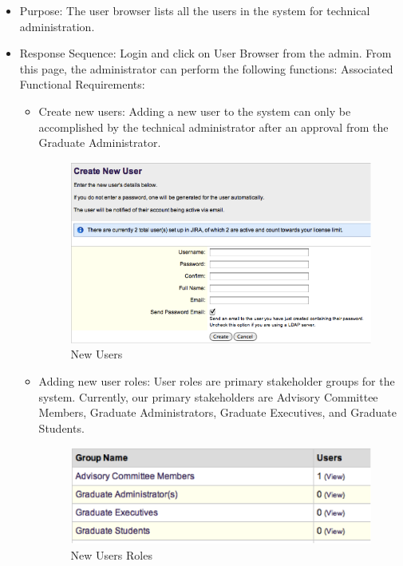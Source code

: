 \documentclass[11pt,a4paper]{report}
\begin{document}
\begin{itemize}
\item Purpose: The user browser lists all the users in the system for technical administration. 
\item Response Sequence: Login and click on User Browser from the admin. From this page, the administrator can perform the following functions:
Associated Functional Requirements:
\begin{itemize}
\item Create new users: Adding a new user to the system can only be accomplished by the technical administrator after an approval from the Graduate Administrator.
\begin{figure}[htp]
\centering
\includegraphics[scale=1]{diagrams/HTMLTemplating/Figure8.png}
\caption{New Users}
\label{fig:NewUser}
\end{figure}
\item Adding new user roles: User roles are primary stakeholder groups for the system. Currently, our primary stakeholders are Advisory Committee Members, Graduate Administrators, Graduate Executives, and Graduate Students.
\begin{figure}[htp]
\centering
\includegraphics[scale=1]{diagrams/HTMLTemplating/Figure9.png}
\caption{New Users Roles}
\label{fig:NewUserRoles}
\end{figure}


\end{itemize}
\end{itemize}
\end{document}
